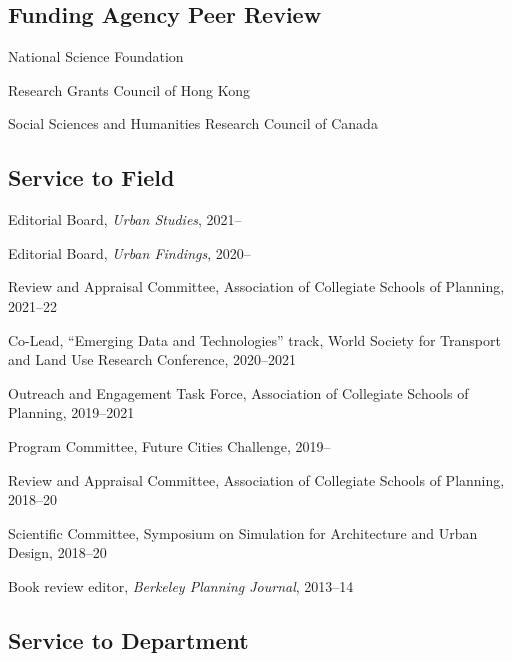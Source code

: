 \documentclass[12pt,letterpaper]{report}
\newcommand{\listitemspace}{0.25em}
\renewenvironment{itemize}
{\begin{list}{}{\setlength{\leftmargin}{0em}
                \setlength{\parskip}{0em}
                \setlength{\itemsep}{\listitemspace}
                \setlength{\parsep}{\listitemspace}}}
{\end{list}}
\begin{document}
    \subsection*{Funding Agency Peer Review}

    \begin{itemize}

        \item National Science Foundation
        \item Research Grants Council of Hong Kong
        \item Social Sciences and Humanities Research Council of Canada

    \end{itemize}

    \subsection*{Service to Field}

    \begin{itemize}

        \item Editorial Board, \textit{Urban Studies}, 2021--
        \item Editorial Board, \textit{Urban Findings}, 2020--
        \item Review and Appraisal Committee, Association of Collegiate Schools of Planning, 2021--22
        \item Co-Lead, \enquote{Emerging Data and Technologies} track, World Society for Transport and Land Use Research Conference, 2020--2021
        \item Outreach and Engagement Task Force, Association of Collegiate Schools of Planning, 2019--2021
        \item Program Committee, Future Cities Challenge, 2019--
        \item Review and Appraisal Committee, Association of Collegiate Schools of Planning, 2018--20
        \item Scientific Committee, Symposium on Simulation for Architecture and Urban Design, 2018--20
        \item Book review editor, \textit{Berkeley Planning Journal}, 2013--14

    \end{itemize}

    \subsection*{Service to Department}
\end{document}
